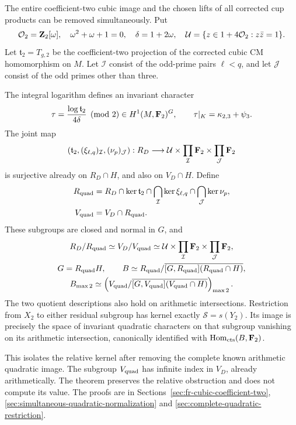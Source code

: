 The entire coefficient-two cubic image and the chosen lifts of all
corrected cup products can be removed simultaneously. Put
\[
 \mathcal O_2=\mathbf Z_2[\omega],\quad \omega^2+\omega+1=0,
 \quad \delta=1+2\omega,
 \quad \mathcal U=\{z\in1+4\mathcal O_2:z\bar z=1\}.
\]
Let \(\mathfrak t_2=T_{g,2}\) be the coefficient-two projection
of the corrected cubic CM homomorphism on \(M\).
Let \(\mathcal I\) consist of the odd-prime pairs \(\ell<q\),
and let \(\mathcal J\) consist of the odd primes other than three.

\begin{theorem}\label{thm:main-simultaneous-quadratic}
The integral logarithm defines an invariant character
\[
 \tau=\frac{\log\mathfrak t_2}{4\delta}\pmod2\in H^1(M,\mathbf F_2)^G,
 \qquad \tau|_K=\kappa_{2,3}+\psi_3.
\]
The joint map
\[
 (\mathfrak t_2,(\xi_{\ell,q})_{\mathcal I},(\nu_p)_{\mathcal J}):R_D
       \longrightarrow\mathcal U\times\prod_{\mathcal I}\mathbf F_2
                                   \times\prod_{\mathcal J}\mathbf F_2
\]
is surjective already on \(R_D\cap H\), and also on \(V_D\cap H\).
Define
\[
 \begin{split}
 R_{\rm quad}&=R_D\cap\ker\mathfrak t_2
          \cap\bigcap_{\mathcal I}\ker\xi_{\ell,q}
          \cap\bigcap_{\mathcal J}\ker\nu_p,\\
 V_{\rm quad}&=V_D\cap R_{\rm quad}.
 \end{split}
\]
These subgroups are closed and normal in \(G\), and
\[
 \begin{gathered}
 R_D/R_{\rm quad}\simeq V_D/V_{\rm quad}
   \simeq\mathcal U\times\prod_{\mathcal I}\mathbf F_2
                                   \times\prod_{\mathcal J}\mathbf F_2,\\
 G=R_{\rm quad}H,\qquad
 B\simeq R_{\rm quad}/
           \overline{[G,R_{\rm quad}](R_{\rm quad}\cap H)},\\
 B_{\max2}\simeq
 \left(V_{\rm quad}/
           \overline{[G,V_{\rm quad}](V_{\rm quad}\cap H)}\right)_{\max2}.
 \end{gathered}
\]
The two quotient descriptions also hold on arithmetic intersections.
Restriction from \(X_2\) to either residual subgroup has kernel
exactly \(\mathcal S=s(Y_2)\). Its image is precisely the space
of invariant quadratic characters on that subgroup vanishing on
its arithmetic intersection, canonically identified with
\(\operatorname{Hom}_{\rm cts}(B,\mathbf F_2)\).
\end{theorem}

This isolates the relative kernel after removing the complete known
arithmetic quadratic image. The subgroup \(V_{\rm quad}\) has
infinite index in \(V_D\), already arithmetically. The theorem
preserves the relative obstruction and does not compute its value.
The proofs are in Sections~\ref{sec:fr-cubic-coefficient-two},
\ref{sec:simultaneous-quadratic-normalization} and
\ref{sec:complete-quadratic-restriction}.
